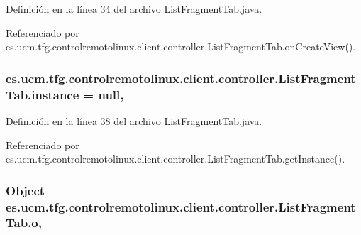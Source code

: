 Definición en la línea 34 del archivo List\-Fragment\-Tab.\-java.



Referenciado por es.\-ucm.\-tfg.\-controlremotolinux.\-client.\-controller.\-List\-Fragment\-Tab.\-on\-Create\-View().

\hypertarget{classes_1_1ucm_1_1tfg_1_1controlremotolinux_1_1client_1_1controller_1_1ListFragmentTab_a0c617994c93a7636b91baa3d116f46f6}{
\subsubsection[{instance}]{ es.\-ucm.\-tfg.\-controlremotolinux.\-client.\-controller.\-List\-Fragment\-Tab.\-instance = null\hspace{0.3cm}{\ttfamily [static]}, {\ttfamily [private]}}}\label{classes_1_1ucm_1_1tfg_1_1controlremotolinux_1_1client_1_1controller_1_1ListFragmentTab_a0c617994c93a7636b91baa3d116f46f6}


Definición en la línea 38 del archivo List\-Fragment\-Tab.\-java.



Referenciado por es.\-ucm.\-tfg.\-controlremotolinux.\-client.\-controller.\-List\-Fragment\-Tab.\-get\-Instance().

\hypertarget{classes_1_1ucm_1_1tfg_1_1controlremotolinux_1_1client_1_1controller_1_1ListFragmentTab_a0e1ccfc5f6d71ad1d59df4b6ff57efef}{
\subsubsection[{o}]{\setlength{\rightskip}{0pt plus 5cm}Object es.\-ucm.\-tfg.\-controlremotolinux.\-client.\-controller.\-List\-Fragment\-Tab.\-o\hspace{0.3cm}{\ttfamily [static]}, {\ttfamily [private]}}}\label{classes_1_1ucm_1_1tfg_1_1controlremotolinux_1_1client_1_1controller_1_1ListFragmentTab_a0e1ccfc5f6d71ad1d59df4b6ff57efef}


